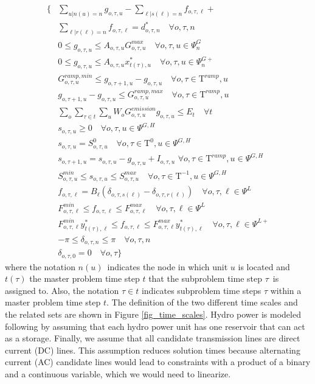 \documentclass[final]{IEEEtran}
\newcommand{\Tau}{\mathrm{T}}
\begin{document}
\begin{align}
\{ &\sum\limits_{u | n(u) = n} g_{o, \tau, u} - \sum\limits_{\ell | s(\ell) = n} f_{o, \tau, \ell} + \nonumber \\
&\sum\limits_{\ell | r(\ell) = n} f_{o, \tau, \ell} = d_{o, \tau, n}^* \quad \forall o, \tau, n\\
&0 \leq g_{o, \tau, u} \leq A_{o, \tau, u} G_{o, \tau, u}^{max} \quad \forall o, \tau, u \in \Psi_n^G \\
&0 \leq g_{o, \tau, u} \leq A_{o, \tau, u} x_{t(\tau), u}^* \quad \forall o, \tau, u \in \Psi_n^{G+} \\
&G^{ramp,min}_{o, \tau, u} \leq g_{o, \tau + 1, u} - g_{o, \tau, u} \quad \forall o, \tau \in \Tau^{ramp}, u \\
&g_{o, \tau + 1, u} - g_{o, \tau, u} \leq G^{ramp,max}_{o, \tau, u} \quad \forall o, \tau \in \Tau^{ramp}, u \\
&\sum\limits_{o} \sum\limits_{\tau \in t} \sum\limits_{u} W_o G^{emission}_{o, \tau, u} g_{o, \tau, u} \leq E_{t} \quad \forall t \\
&s_{o, \tau, u} \geq 0 \quad \forall o, \tau, u \in \Psi^{G, H} \\
&s_{o, \tau, u} = S^0_{o, \tau, u} \quad \forall o, \tau \in \Tau^0, u \in \Psi^{G, H} \\
&s_{o, \tau + 1, u} = s_{o, \tau, u} - g_{o, \tau, u} + I_{o, \tau, u} \, \, \forall o, \tau \in \Tau^{ramp}, u \in \Psi^{G, H} \\
&S^{min}_{o, \tau, u} \leq s_{o, \tau, u} \leq S^{max}_{o, \tau, u} \quad \forall o, \tau \in \Tau^{-1}, u \in \Psi^{G, H} \\
&f_{o, \tau, \ell} = B_\ell (\delta_{o, \tau, s(\ell)} - \delta_{o, \tau, r(\ell)}) \quad \forall o, \tau, \ell \in \Psi^L \\
&F_{o, \tau, \ell}^{min} \leq f_{o, \tau, \ell} \leq F_{o, \tau, \ell}^{max} \quad \forall o, \tau, \ell \in \Psi^L \\
&F_{o, \tau, \ell}^{min} y_{t(\tau), \ell}^* \leq f_{o, \tau, \ell} \leq F_{o, \tau, \ell}^{max} y_{t(\tau), \ell}^* \quad \forall o, \tau, \ell \in \Psi^{L+} \\
&-\pi \leq \delta_{o, \tau, n} \leq \pi \quad \forall o, \tau, n \\
&\delta_{o, \tau, 0} = 0 \quad \forall o, \tau \}
\end{align}
where the notation $n(u)$ indicates the node in which unit $u$ is located and $t(\tau)$ the master problem time step $t$ that the subproblem time step $\tau$ is assigned to. Also, the notation $\tau \in t$ indicates subproblem time steps $\tau$ within a master problem time step $t$. The definition of the two different time scales and the related sets are shown in Figure \ref{fig_time_scales}. Hydro power is modeled following \cite{Debia} by assuming that each hydro power unit has one reservoir that can act as a storage. Finally, we assume that all candidate transmission lines are direct current (DC) lines. This assumption reduces solution times because alternating current (AC) candidate lines would lead to constraints with a product of a binary and a continuous variable, which we would need to linearize.
\end{document}
